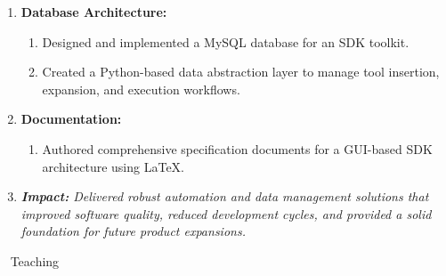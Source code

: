 \documentclass[oneside]{article}%
\begin{document}
\begin{enumerate}[]
\begin{enumerate}[]
			\begin{enumerate}[-]
				\item Created a GUI-based test automation application using Python (GTK).
				\item Wrote architectural specifications in \LaTeX\ to ensure clarity and maintainability.
			\end{enumerate}
		\item \textbf{Database Architecture:}
			\begin{enumerate}[-]
				\item Designed and implemented a MySQL database for an SDK toolkit.
				\item Created a Python-based data abstraction layer to manage tool insertion, expansion, and execution workflows.
			\end{enumerate}
		\item \textbf{Documentation:}
			\begin{enumerate}[-]
				\item Authored comprehensive specification documents for a GUI-based SDK architecture using \LaTeX.
			\end{enumerate}
		\item \textit{\textbf{Impact:} Delivered robust automation and data management solutions that improved software quality, reduced development cycles, 
	and provided a solid foundation for future product expansions.}
	\end{enumerate}
\end{enumerate}
\
\newpage
\noindent
\huge{Teaching}
\small
\end{document}
